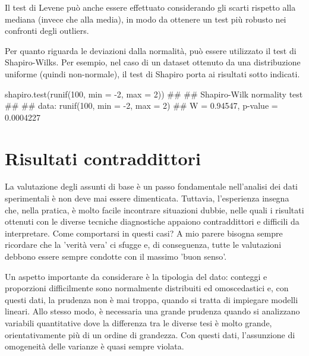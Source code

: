 \documentclass[a4paper,12pt,oneside]{book}
\newenvironment{Shaded}{}{}
\newcommand{\KeywordTok}[1]{#1}
\newcommand{\DataTypeTok}[1]{#1}
\newcommand{\DecValTok}[1]{#1}
\newcommand{\CommentTok}[1]{#1}
\newcommand{\NormalTok}[1]{#1}
\begin{document}
Il test di Levene può anche essere effettuato considerando gli scarti rispetto alla mediana (invece che alla media), in modo da ottenere un test più robusto nei confronti degli outliers.

Per quanto riguarda le deviazioni dalla normalità, può essere
utilizzato il test di Shapiro-Wilks. Per esempio, nel caso di un dataset ottenuto da una distribuzione uniforme (quindi non-normale), il test di Shapiro porta ai risultati sotto indicati.

\begin{Shaded}
\begin{Highlighting}[]
\KeywordTok{shapiro.test}\NormalTok{(}\KeywordTok{runif}\NormalTok{(}\DecValTok{100}\NormalTok{, }\DataTypeTok{min =} \DecValTok{-2}\NormalTok{, }\DataTypeTok{max =} \DecValTok{2}\NormalTok{))}
\CommentTok{## }
\CommentTok{##  Shapiro-Wilk normality test}
\CommentTok{## }
\CommentTok{## data:  runif(100, min = -2, max = 2)}
\CommentTok{## W = 0.94547, p-value = 0.0004227}
\end{Highlighting}
\end{Shaded}

\hypertarget{risultati-contraddittori}{%
\section{Risultati contraddittori}\label{risultati-contraddittori}}

La valutazione degli assunti di base è un passo fondamentale nell'analisi dei dati sperimentali è non deve mai essere dimenticata. Tuttavia, l'esperienza insegna che, nella pratica, è molto facile incontrare situazioni dubbie, nelle quali i risultati ottenuti con le diverse tecniche diagnostiche appaiono contraddittori e difficili da interpretare. Come comportarsi in questi casi? A mio parere bisogna sempre ricordare che la 'verità vera' ci sfugge e, di conseguenza, tutte le valutazioni debbono essere sempre condotte con il massimo 'buon senso'.

Un aspetto importante da considerare è la tipologia del dato: conteggi e proporzioni difficilmente sono normalmente distribuiti ed omoscedastici e, con questi dati, la prudenza non è mai troppa, quando si tratta di impiegare modelli lineari. Allo stesso modo, è necessaria una grande prudenza quando si analizzano variabili quantitative dove la differenza tra le diverse tesi è molto grande, orientativamente più di un ordine di grandezza. Con questi dati, l'assunzione di omogeneità delle varianze è quasi sempre violata.
\end{document}
